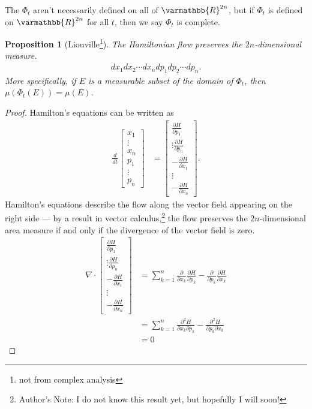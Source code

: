 \documentclass[12pt]{extarticle}
\newcommand{\R}{\varmathbb{R}}
\theoremstyle{plain}
\newtheorem*{proposition}{Proposition}%
\theoremstyle{definition}
\theoremstyle{remark}
\begin{document}
  The $\Phi_t$ aren't necessarily defined on all of $\R^{2n}$, but if $\Phi_t$ is defined on $\R^{2n}$ for all $t$, then we say $\Phi_t$ is complete.
  \begin{proposition}[Liouville\footnote{not from complex analysis}]
    The Hamiltonian flow preserves the $2n$-dimensional measure.
    \begin{align*}
      dx_1 dx_2 \cdots dx_n dp_1 dp_2 \cdots dp_n.
    \end{align*}
    More specifically, if $E$ is a measurable subset of the domain of $\Phi_t$, then $\mu\left(\Phi_t(E)\right) = \mu(E)$.
  \end{proposition}
  \begin{proof}
    Hamilton's equations can be written as
        \begin{align*}
          \frac{d}{dt} \begin{bmatrix}x_1\\\vdots\\x_n\\p_1\\\vdots\\p_n\end{bmatrix} &= \begin{bmatrix}\frac{\partial H}{\partial p_1}\\\vdots \frac{\partial H}{\partial p_n}\\-\frac{\partial H}{\partial x_1}\\\vdots\\-\frac{\partial H}{\partial x_n}\end{bmatrix}.
        \end{align*}
        Hamilton's equations describe the flow along the vector field appearing on the right side --- by a result in vector calculus,\footnote{Author's Note: I do not know this result yet, but hopefully I will soon!} the flow preserves the $2n$-dimensional area measure if and only if the divergence of the vector field is zero.
        \begin{align*}
          \nabla \cdot \begin{bmatrix}\frac{\partial H}{\partial p_1}\\\vdots \frac{\partial H}{\partial p_n}\\-\frac{\partial H}{\partial x_1}\\\vdots\\-\frac{\partial H}{\partial x_n}\end{bmatrix} &= \sum_{k=1}^{n}\frac{\partial}{\partial x_k}\frac{\partial H}{\partial p_{k}} - \frac{\partial}{\partial p_k}\frac{\partial H}{\partial x_{k}}\\
         &= \sum_{k=1}^{n}\frac{\partial^{2} H}{\partial x_k \partial p_k} - \frac{\partial^2 H}{\partial p_k\partial x_k}\\
          &= 0
        \end{align*}
  \end{proof}
\end{document}
